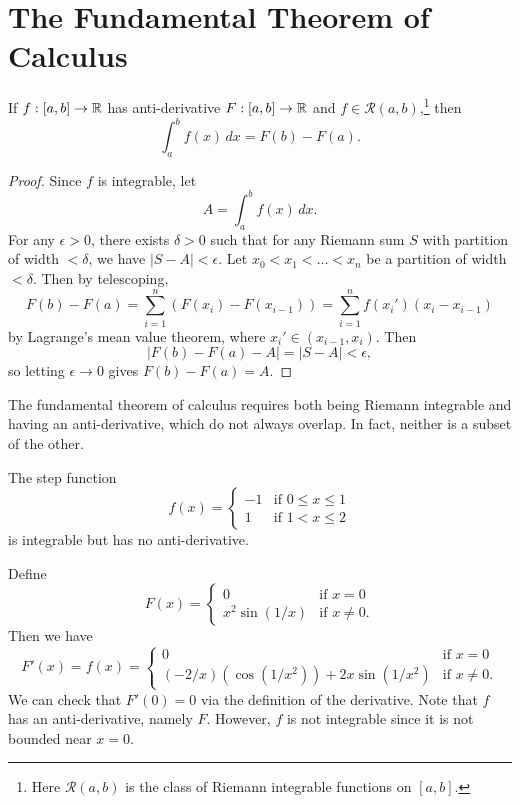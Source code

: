 \section{The Fundamental Theorem of Calculus}
\begin{theorem}
  If $f : [a, b] \to \mathbb{R}$ has anti-derivative
  $F : [a, b] \to \mathbb{R}$ and $f \in \mathcal{R}(a, b)$,\footnote{Here $\mathcal{R}(a, b)$ is the class of Riemann integrable functions on $[a, b]$.}
  then
  \[
    \int_a^b f(x)\, dx = F(b) - F(a).
  \]
\end{theorem}

\begin{proof}
  Since $f$ is integrable, let
  \[
    A = \int_a^b f(x)\, dx.
  \]
  For any $\epsilon > 0$, there exists $\delta > 0$
  such that for any Riemann sum $S$ with partition of
  width $< \delta$, we have $|S - A| < \epsilon$. Let
  $x_0 < x_1 < \dots < x_n$ be a partition of
  width $< \delta$. Then by telescoping,
  \[
    F(b) - F(a) = \sum_{i = 1}^n (F(x_i) - F(x_{i - 1}))
    = \sum_{i = 1}^n f(x_i') (x_i - x_{i - 1})
  \]
  by Lagrange's mean value theorem, where
  $x_i' \in (x_{i - 1}, x_i)$. Then
  \[
    |F(b) - F(a) - A| = |S - A| < \epsilon,
  \]
  so letting $\epsilon \to 0$ gives $F(b) - F(a) = A$.
\end{proof}

\begin{remark}
  The fundamental theorem of calculus requires both
  being Riemann integrable and having an anti-derivative,
  which do not always overlap. In fact, neither is
  a subset of the other.
\end{remark}

\begin{example}
  The step function
  \[
    f(x) =
    \begin{cases}
      -1 & \text{if } 0 \le x \le 1 \\
      1 & \text{if } 1 < x \le 2
    \end{cases}
  \]
  is integrable but has no anti-derivative.
\end{example}

\begin{example}
  Define
  \[
    F(x) =
    \begin{cases}
      0 & \text{if } x = 0 \\
      x^2 \sin(1/x) & \text{if } x \ne 0.
    \end{cases}
  \]
  Then we have
  \[
    F'(x) = f(x) =
    \begin{cases}
      0 & \text{if } x = 0 \\
      (-2 / x)(\cos(1 / x^2)) + 2x \sin(1 / x^2) & \text{if } x \ne 0.
    \end{cases}
  \]
  We can check that $F'(0) = 0$ via the definition
  of the derivative. Note that $f$ has an anti-derivative,
  namely $F$. However, $f$ is not integrable since
  it is not bounded near $x = 0$.
\end{example}
